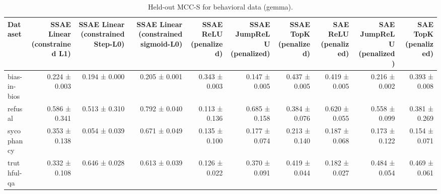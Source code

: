 \begin{table}[t]
\centering
\caption{Held-out MCC-S for behavioral data (gemma).}
\label{tab:behavioral-gemma-mcc-s}
\begin{tabular}{lrrrrrrrrr}
\toprule
Dataset & SSAE Linear (constrained L1) & SSAE Linear (constrained Step-L0) & SSAE Linear (constrained sigmoid-L0) & SSAE ReLU (penalized) & SSAE JumpReLU (penalized) & SSAE TopK (penalized) & SAE ReLU (penalized) & SAE JumpReLU (penalized) & SAE TopK (penalized) \\
\midrule
bias-in-bios & 0.224 ± 0.003 & 0.194 ± 0.000 & 0.205 ± 0.001 & 0.343 ± 0.003 & 0.147 ± 0.005 & 0.437 ± 0.005 & 0.419 ± 0.005 & 0.216 ± 0.002 & 0.393 ± 0.008 \\
refusal & 0.586 ± 0.341 & 0.513 ± 0.310 & 0.792 ± 0.040 & 0.113 ± 0.136 & 0.685 ± 0.158 & 0.384 ± 0.076 & 0.620 ± 0.055 & 0.558 ± 0.099 & 0.381 ± 0.269 \\
sycophancy & 0.353 ± 0.138 & 0.054 ± 0.039 & 0.671 ± 0.049 & 0.135 ± 0.100 & 0.177 ± 0.074 & 0.213 ± 0.140 & 0.187 ± 0.068 & 0.173 ± 0.122 & 0.154 ± 0.071 \\
truthful-qa & 0.332 ± 0.108 & 0.646 ± 0.028 & 0.613 ± 0.039 & 0.126 ± 0.022 & 0.370 ± 0.091 & 0.419 ± 0.044 & 0.182 ± 0.027 & 0.484 ± 0.054 & 0.469 ± 0.061 \\
\bottomrule
\end{tabular}
\end{table}
